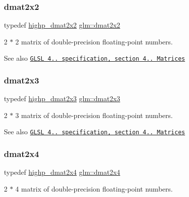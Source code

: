 \subsubsection{\texorpdfstring{dmat2x2}{dmat2x2}}
{\footnotesize\ttfamily typedef \hyperlink{group__core__precision_gaf0445ee32625d26bf79bb84e3d5a5502}{highp\+\_\+dmat2x2} \hyperlink{group__core__types_gae9932771e11a4f38e21f1136423bab18}{glm\+::dmat2x2}}

2 $\ast$ 2 matrix of double-\/precision floating-\/point numbers.

\begin{DoxySeeAlso}{See also}
\href{http://www.opengl.org/registry/doc/GLSLangSpec.4.20.8.pdf}{\tt G\+L\+SL 4.. specification, section 4.. Matrices} 
\end{DoxySeeAlso}
\mbox{\label{group__core__types_ga6b5ff9888ca0e468f35b637d4c3a361d}} 
\subsubsection{\texorpdfstring{dmat2x3}{dmat2x3}}
{\footnotesize\ttfamily typedef \hyperlink{group__core__precision_ga29884defff6f7109b1e99ef8a6ce7e0a}{highp\+\_\+dmat2x3} \hyperlink{group__core__types_ga6b5ff9888ca0e468f35b637d4c3a361d}{glm\+::dmat2x3}}

2 $\ast$ 3 matrix of double-\/precision floating-\/point numbers.

\begin{DoxySeeAlso}{See also}
\href{http://www.opengl.org/registry/doc/GLSLangSpec.4.20.8.pdf}{\tt G\+L\+SL 4.. specification, section 4.. Matrices} 
\end{DoxySeeAlso}
\mbox{\label{group__core__types_ga2d1dd4b4925d1ea67539902c820483a0}} 
\subsubsection{\texorpdfstring{dmat2x4}{dmat2x4}}
{\footnotesize\ttfamily typedef \hyperlink{group__core__precision_ga2b1bf87a8f8fbc895127c6bfde7a271e}{highp\+\_\+dmat2x4} \hyperlink{group__core__types_ga2d1dd4b4925d1ea67539902c820483a0}{glm\+::dmat2x4}}

2 $\ast$ 4 matrix of double-\/precision floating-\/point numbers.

